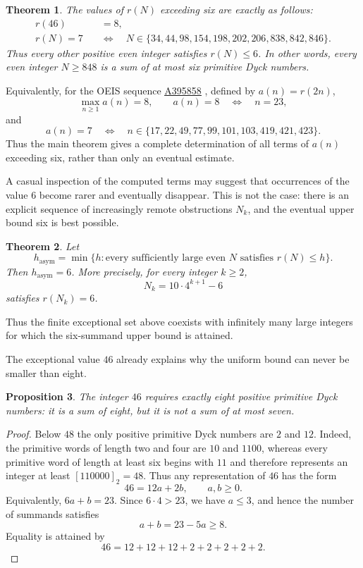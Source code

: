 \documentclass[12pt]{article}
\theoremstyle{plain}
\newtheorem{theorem}{Theorem}
\newtheorem{proposition}[theorem]{Proposition}
\theoremstyle{definition}
\theoremstyle{plain}
\newcommand{\seqnum}[1]{\href{https://oeis.org/#1}{\rm \underline{#1}}}
\begin{document}
\begin{theorem}\label{thm:classification}
The values of $r(N)$ exceeding six are exactly as follows:
\[
\begin{aligned}
 r(46)&=8,\\[4pt]
 r(N)=7\quad&\Longleftrightarrow\quad
 N\in\{34,44,98,154,198,202,206,838,842,846\}.
\end{aligned}
\]
Thus every other positive even integer satisfies $r(N)\leq6$.  In other
words, every even integer $N\geq848$ is a sum of at most six primitive
Dyck numbers.
\end{theorem}

Equivalently, for the OEIS sequence \seqnum{A395858}
\cite{OEIS-A395858}, defined by $a(n)=r(2n)$,
\[
        \max_{n\geq1}a(n)=8,
        \qquad
        a(n)=8\quad\Longleftrightarrow\quad n=23,
\]
and
\[
 a(n)=7
 \quad\Longleftrightarrow\quad
 n\in\{17,22,49,77,99,101,103,419,421,423\}.
\]
Thus the main theorem gives a complete determination of all terms of
$a(n)$ exceeding six, rather than only an eventual estimate.


A casual inspection of the computed terms may suggest that occurrences of
the value $6$ become rarer and eventually disappear.  This is not the case:
there is an explicit sequence of increasingly remote obstructions $N_k$, and
the eventual upper bound six is best possible.

\begin{theorem}\label{thm:asymptotic-order}
Let
\[
 h_{\mathrm{asym}}
 =\min\{h:\text{every sufficiently large even }N\text{ satisfies }r(N)\leq h\}.
\]
Then $h_{\mathrm{asym}}=6$.  More precisely, for every integer $k\geq2$,
\[
 N_k=10\cdot4^{k+1}-6
\]
satisfies $r(N_k)=6$.
\end{theorem}

Thus the finite exceptional set above coexists with infinitely many large
integers for which the six-summand upper bound is attained.

The exceptional value $46$ already explains why the uniform bound can
never be smaller than eight.

\begin{proposition}\label{prop:46}
The integer $46$ requires exactly eight positive primitive Dyck numbers:
it is a sum of eight, but it is not a sum of at most seven.
\end{proposition}

\begin{proof}
Below $48$ the only positive primitive Dyck numbers are $2$ and $12$.
Indeed, the primitive words of length two and four are $10$ and $1100$,
whereas every primitive word of length at least six begins with $11$ and
therefore represents an integer at least $[110000]_2=48$.  Thus any
representation of $46$ has the form
\[
        46=12a+2b,\qquad a,b\geq0.
\]
Equivalently, $6a+b=23$.  Since $6\cdot4>23$, we have $a\leq3$, and
hence the number of summands satisfies
\[
        a+b=23-5a\geq8.
\]
Equality is attained by
\[
        46=12+12+12+2+2+2+2+2.
\]
\end{proof}
\end{document}
